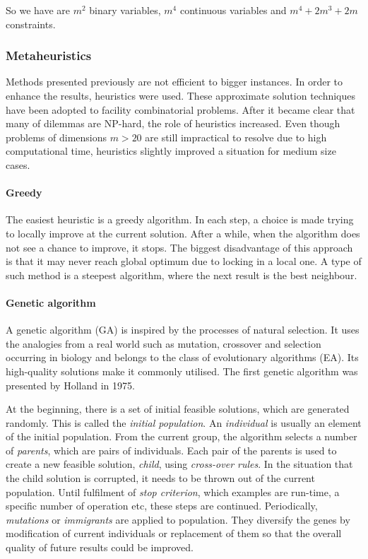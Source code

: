\documentclass[english,a4paper,twoside]{ppfcmthesis}
\begin{document}
So we have are $m^2$ binary variables, $m^4$ continuous variables and $m^4+2m^3+2m$ constraints.

\subsubsection{Metaheuristics}
Methods presented previously are not efficient to bigger instances.
In order to enhance the results, heuristics were used.
These approximate solution techniques have been adopted to facility combinatorial problems.
After it became clear that many of dilemmas are NP-hard, the role of heuristics increased.
Even though problems of dimensions $m > 20$ are still impractical to resolve due to high computational time, heuristics slightly improved a situation for medium size cases.

\paragraph{Greedy}

The easiest heuristic is a greedy algorithm.
In each step, a choice is made trying to locally improve at the current solution.
After a while, when the algorithm does not see a chance to improve, it stops.
The biggest disadvantage of this approach is that it may never reach global optimum due to locking in a local one. A type of such method is a steepest algorithm, where the next result is the best neighbour.


\paragraph{Genetic algorithm}

A genetic algorithm (GA) is inspired by the processes of natural selection.
It uses the analogies from a real world such as mutation, crossover and selection occurring in biology and belongs to the class of evolutionary algorithms (EA).
Its high-quality solutions make it commonly utilised.
The first genetic algorithm was presented by Holland \cite{holland1975adaptation} in 1975.

At the beginning, there is a set of initial feasible solutions, which are generated randomly.
This is called the \textit{initial population}.
An \textit{individual} is usually an element of the initial population.
From the current group, the algorithm selects a number of \textit{parents}, which are pairs of individuals.
Each pair of the parents is used to create a new feasible solution, \textit{child}, using \textit{cross-over rules}.
In the situation that the child solution is corrupted, it needs to be thrown out of the current population.
Until fulfilment of \textit{stop criterion}, which examples are run-time, a specific number of operation etc, these steps are continued.
Periodically, \textit{mutations} or \textit{immigrants} are applied to population.
They diversify the genes by modification of current individuals or replacement of them so that the overall quality of future results could be improved.
\end{document}
